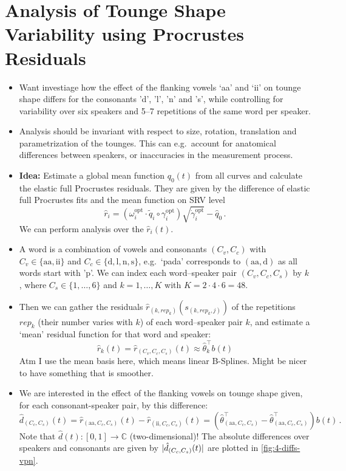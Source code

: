 \section{Analysis of Tounge Shape Variability using Procrustes Residuals}
\begin{itemize}
  \item Want investiage how the effect of the flanking vowels \enquote*{aa} and \enquote*{ii} on tounge shape differs for the consonants 'd', 'l', 'n' and 's', while controlling for variability over six speakers and 5--7 repetitions of the same word per speaker.
  \item Analysis should be invariant with respect to size, rotation, translation and parametrization of the tounges.
    This can e.g.\ account for anatomical differences between speakers, or inaccuracies in the measurement process.
  \item \textbf{Idea:} Estimate a global mean function $q_0(t)$ from all curves and calculate the elastic full Procrustes residuals.
    They are given by the difference of elastic full Procrustes fits and the mean function on SRV level
    $$ \hat r_i = \left( \omega_i^\mathrm{opt} \cdot \widetilde q_i \circ \gamma_i^\mathrm{opt} \right) \sqrt{\dot\gamma_i^\mathrm{opt}} - \hat q_0 \,.$$
    We can perform analysis over the $\hat r_i(t)$. 
  \item A word is a combination of vowels and consonants $(C_v, C_c)$ with $C_v \in \{\mathrm{aa}, \mathrm{ii}\}$ and $C_c \in \{\mathrm{d},\mathrm{l},\mathrm{n},\mathrm{s}\}$, e.g.\ \enquote*{pada} corresponds to $(\mathrm{aa},\mathrm{d})$ as all words start with 'p'.
    We can index each word--speaker pair $\left( C_v, C_c, C_s \right)$ by $k$, where $C_s \in \{1,\dots,6\}$ and $k = 1, \dots, K$ with $K = 2 \cdot 4 \cdot 6 = 48$.
  \item Then we can gather the residuals $\hat r_{(k, rep_k)}(s_{(k,rep_k,j)})$ of the repetitions $rep_k$ (their number varies with $k$) of each word--speaker pair $k$, and estimate a \enquote*{mean} residual function for that word and speaker:
    $$ \hat r_k (t) = \hat r_{\left( C_v, C_c, C_s \right)} (t) \approx \hat \theta_k^\top b(t)$$
    Atm I use the mean basis here, which means linear B-Splines. Might be nicer to have something that is smoother.
  \item We are interested in the effect of the flanking vowels on tounge shape given, for each consonant-speaker pair, by this difference:
    $$ \hat d_{(C_c, C_s)}(t) = \hat r_{(\mathrm{aa}, C_c, C_s)} (t) - \hat r_{(\mathrm{ii}, C_c, C_s)} (t) = 
      \left( \hat\theta^\top_{(\mathrm{aa}, C_c, C_s)} - \hat\theta^\top_{(\mathrm{aa}, C_c, C_s)} \right) b(t)\,. $$
    Note that $\hat d(t) : [0,1] \rightarrow \mathbb{C}$ (two-dimensional)! The absolute differences over speakers and consonants are given by $\lvert\hat d_{(C_c, C_s)}(t)\rvert$ are plotted in \cref{fig:4-diffs-vpn}.
\end{itemize}
